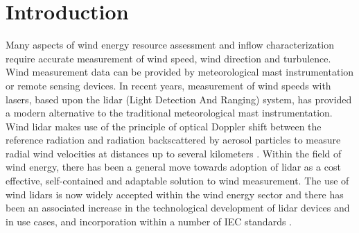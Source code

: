 \documentclass[remotesensing,article,submit,pdftex,moreauthors]{Definitions/mdpi}
\begin{document}



\section{Introduction}
Many aspects of wind energy resource assessment and inflow characterization require accurate measurement of wind speed, wind direction and turbulence. Wind measurement data can be provided by meteorological mast instrumentation or remote sensing devices. In recent years, measurement of wind speeds with lasers, based upon the lidar (Light Detection And Ranging) system, has provided a modern alternative to the traditional meteorological mast instrumentation. Wind lidar makes use of the principle of optical Doppler shift between the reference radiation and radiation backscattered by aerosol particles to measure radial wind velocities at distances up to several kilometers \cite{ref-Liu}.
Within the field of wind energy, there has been a general move towards adoption of lidar as a cost effective, self-contained and adaptable solution to wind measurement.
The use of wind lidars is now widely accepted within the wind energy sector and there has been an associated increase in the technological development of lidar devices and in use cases, and incorporation within a number of IEC standards \cite{ref-IEC61400-12-1, ref-IEC61400-50-2, ref-IEC61400-50-3}.
\end{document}
